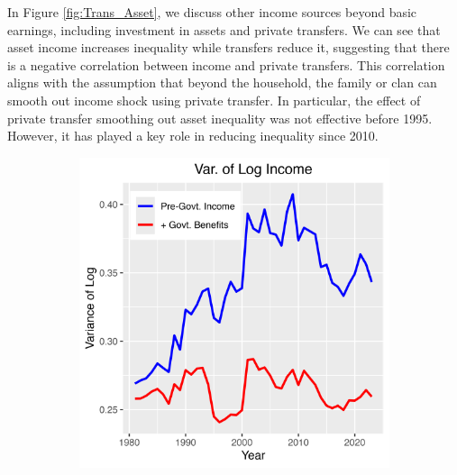 \documentclass{article}
\begin{document}
In Figure \ref{fig:Trans_Asset}, we discuss other income sources beyond basic earnings, including investment in assets and private transfers. 
We can see that asset income increases inequality while transfers reduce it, suggesting that there is a negative correlation between income and private transfers. 
This correlation aligns with the assumption that beyond the household, the family or clan can smooth out income shock using private transfer. 
In particular, the effect of private transfer smoothing out asset inequality was not effective before 1995. However, it has played a key role in reducing inequality since 2010.

\begin{figure}[t]
    \centering
    \begin{subfigure}[t]{0.475\textwidth}
        \centering
        \includegraphics[width=\textwidth]{figures/Fig_5/Fig_5a_Var_inc.png}
    \end{subfigure}
    \begin{subfigure}[t]{0.475\textwidth}
        \centering

\end{subfigure}
\end{figure}
\end{document}
